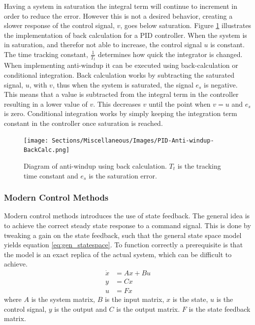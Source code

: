 \documentclass[../../main.tex]{subfiles}
\begin{document}
Having a system in saturation the integral term will continue to increment in order to reduce the error. However this is not a desired behavior, creating a slower response of the control signal, $v$, goes below saturation. Figure \ref{fig:anti-windup} illustrates the implementation of back calculation for a PID controller. When the system is in saturation, and therefor not able to increase, the control signal $u$ is constant. The time tracking constant, $\frac{1}{T_t}$ determines how quick the integrator is changed. When implementing anti-windup it can be executed using back-calculation or conditional integration. Back calculation works by subtracting the saturated signal, $u$, with $v$, thus when the system is saturated, the signal $e_s$ is negative. This means that a value is subtracted from the integral term in the controller resulting in a lower value of $v$. This decreases $v$ until the point when $v=u$ and $e_s$ is zero. Conditional integration works by simply keeping the integration term constant in the controller once saturation is reached. 

\begin{figure}
    \centering
    \texttt{[image: Sections/Miscellaneous/Images/PID-Anti-windup-BackCalc.png]}
    \caption{Diagram of anti-windup using back calculation. $T_t$ is the tracking time constant and $e_s$ is the saturation error.}
    \label{fig:anti-windup}
\end{figure}

\subsubsection*{Modern Control Methods}
Modern control methods introduces the use of state feedback. The general idea is to achieve the correct steady state response to a command signal. This is done by tweaking a gain on the state feedback, such that the general state space model yields equation \ref{eq:gen_statespace}. To function correctly a prerequisite is that the model is an exact replica of the actual system, which can be difficult to achieve.
\begin{equation}\label{eq:gen_statespace}
    \begin{split}
        \Dot{x}&=Ax+Bu \\
        y&=Cx \\
        u&=Fx
    \end{split}
\end{equation}
where $A$ is the system matrix, $B$ is the input matrix, $x$ is the state, $u$ is the control signal, $y$ is the output and $C$ is the output matrix. $F$ is the state feedback matrix. 
\end{document}
